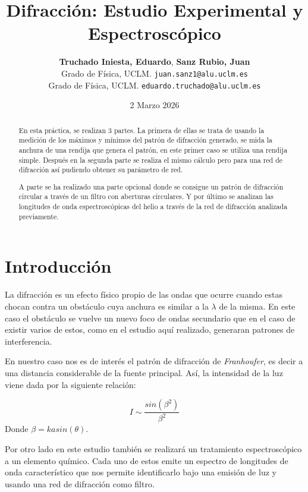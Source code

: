 \documentclass[11pt, a4paper, twocolumn]{article}
\title{\textbf{\Large Difracción: Estudio Experimental y Espectroscópico}}
\author{
    \textbf{Truchado Iniesta, Eduardo}, \textbf{Sanz Rubio, Juan} \\
    \small Grado de Física, UCLM. \texttt{juan.sanz1@alu.uclm.es} \\
    \small Grado de Física, UCLM. \texttt{eduardo.truchado@alu.uclm.es}
}
\date{\small 2 Marzo 2026}
\begin{document}
\sloppy

\maketitle
\thispagestyle{fancy}


\begin{abstract}
En esta práctica, se realizan 3 partes. La primera de ellas se trata de usando la medición de los máximos y mínimos del patrón 
de difracción generado, se mida la anchura de una rendija que genera el patrón, en este primer caso se utiliza una rendija simple. 
Después en la segunda parte se realiza el mismo cálculo pero para una red de difracción así pudiendo obtener su parámetro de red. 

\vspace{0.2cm}

A parte se ha realizado una parte opcional donde se consigue un patrón de difracción circular a través de un filtro con aberturas circulares. Y por último se analizan las 
longitudes de onda espectroscópicas del helio a través de la red de difracción analizada previamente. 
\end{abstract}



\section{Introducción}
La difracción es un efecto físico propio de las ondas que ocurre cuando estas chocan contra un obstáculo cuya anchura
es similar a la $\lambda$ de la misma. En este caso el obstáculo se vuelve un nuevo foco de ondas secundario que en el 
caso de existir varios de estos, como en el estudio aquí realizado, generaran patrones de interferencia. 

\vspace{0.2cm}

En nuestro caso nos es de interés el patrón de difracción de \textit{Franhoufer}, es decir a una distancia considerable de la 
fuente principal. Así, la intensidad de la luz viene dada por la siguiente relación: 

\begin{equation}
    I \sim \frac{sin(\beta^{2})}{\beta^{2}}
\end{equation}
Donde $\beta = k a sin(\theta)$. 

\vspace{0.2cm}

Por otro lado en este estudio también se realizará un tratamiento espectroscópico a un elemento químico. Cada uno de estos 
emite un espectro de longitudes de onda característico que nos permite identificarlo bajo una emisión de luz y usando una red 
de difracción como filtro.
\end{document}
